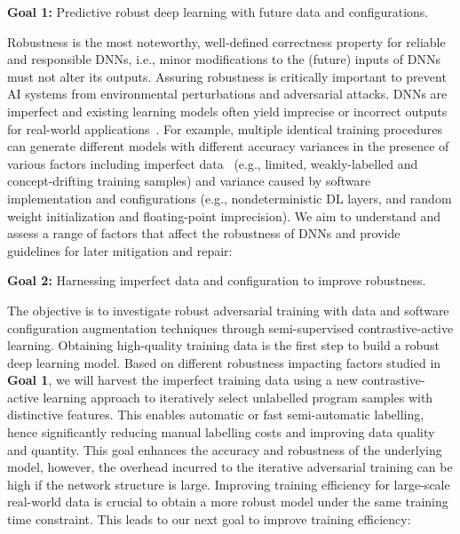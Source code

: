 \begin{formal}\noindent
{\bf Goal 1:} Predictive robust deep learning with future data and configurations.\label{goal1}
\end{formal}
\noindent
Robustness is the most noteworthy, well-defined correctness property for reliable and responsible DNNs, i.e., minor modifications to the (future) inputs of DNNs must not alter its outputs. Assuring robustness is critically important to prevent AI systems from environmental perturbations and adversarial attacks.
DNNs are imperfect and existing learning models often yield imprecise or incorrect outputs for real-world applications~\cite{pham2020problems,xiao2021nondeterministic}. 
For example, multiple identical training procedures can generate different models with different accuracy variances in the presence of various factors including imperfect data~\cite{zhang2019familial,menzies2012promise,shu2020omni} (e.g., limited, weakly-labelled and concept-drifting training samples) and variance caused by software implementation and configurations  (e.g., nondeterministic DL layers, and random weight initialization and floating-point imprecision). 
We aim to understand and assess a range of factors that affect the robustness of DNNs and provide guidelines for later mitigation and repair: 

\begin{formal}\noindent
{\bf Goal 2:} Harnessing imperfect data and configuration to improve robustness.
\end{formal}
\noindent
The objective is to investigate robust adversarial training with data and software configuration augmentation techniques through semi-supervised contrastive-active learning. 
Obtaining high-quality training data is the first step to build a robust deep learning model. Based on different robustness impacting factors studied in \textbf{Goal 1}, we will harvest the imperfect training data using a new contrastive-active learning approach to iteratively select unlabelled program samples with distinctive features. This enables automatic or fast semi-automatic labelling, hence significantly reducing
manual labelling costs and improving data quality and quantity. This goal enhances the accuracy and robustness of the underlying model, however, the overhead incurred to the iterative adversarial training can be high if the network structure is large. Improving training efficiency for large-scale real-world data is crucial to obtain a more robust model under the same training time constraint. This leads to our next goal to improve training efficiency:


